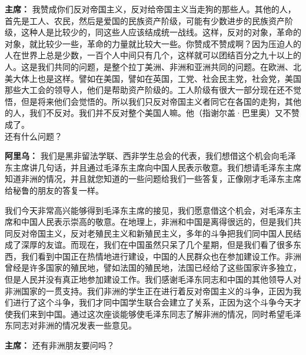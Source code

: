 \begin{duihua}
\item[\textbf{主席：}] 我赞成你们反对帝国主义，反对给帝国主义当走狗的那些人。其他的人，首先是工人、农民，然后是爱国的民族资产阶级，可能有少数进步的民族资产阶级，这种人是比较少的，同这些人应该结成统一战线。这样，反对的对象，革命的对象，就比较少一些，革命的力量就比较大一些。你赞成不赞成啊？因为压迫人的人在世界上总是少数，一百个人中间只有几个，这样就可以团结百分之九十以上的人。这是我们共同的问题，是整个拉丁美洲、非洲和亚洲共同的问题。在欧洲、北美大体上也是这样。譬如在美国，譬如在英国，工党、社会民主党，社会党，美国那些大工会的领导人，他们是帮助资产阶级的。工人阶级有很大一部分现在还不觉悟，但是将来他们会觉悟的。所以我们只反对帝国主义者同它在各国的走狗，其他的人，我们不反对。我们并不反对整个美国人嘛。他（指谢尔盖·巴里奥）又不赞成了。\\
还有什么问题？

\item[\textbf{阿里乌：}] 我们是黑非留法学联、西非学生总会的代表，我们想借这个机会向毛泽东主席讲几句话，并且通过毛泽东主席向中国人民表示敬意。我们想请毛泽东主席知道非洲的情况，并且就您知道的一些问题给我们一些答复，正像刚才毛泽东主席给秘鲁的朋友的答复一样。

我们今天非常高兴能够得到毛泽东主席的接见，我们愿意借这个机会，对毛泽东主席和中国人民表示崇高的敬意。在地理上，非洲和中国是离得很远的，但是我们共同反对帝国主义，反对老殖民主义和新殖民主义，多年的斗争把我们同中国人民结成了深厚的友谊。而现在，我们在中国虽然只呆了几个星期，但是我们看了很多东西，我们看到中国正在热情地进行建设，中国的人民群众也在参加建设工作。非洲曾经是许多国家的殖民地，譬如法国的殖民地，法国已经给了这些国家许多独立，但是人民并没有真正地参加建设工作。我们感谢毛泽东同志和中国的其他领导人对非洲国家的一贯支持。我们非洲的学生正在进行着反对帝国主义的斗争，正因为我们进行了这个斗争，我们才同中国学生联合会建立了关系，正因为这个斗争今天才使我们来到中国。通过这次座谈能够使毛泽东同志了解非洲的情况，同时希望毛泽东同志对非洲的情况发表一些意见。

\item[\textbf{主席：}] 还有非洲朋友要问吗？


\end{duihua}
